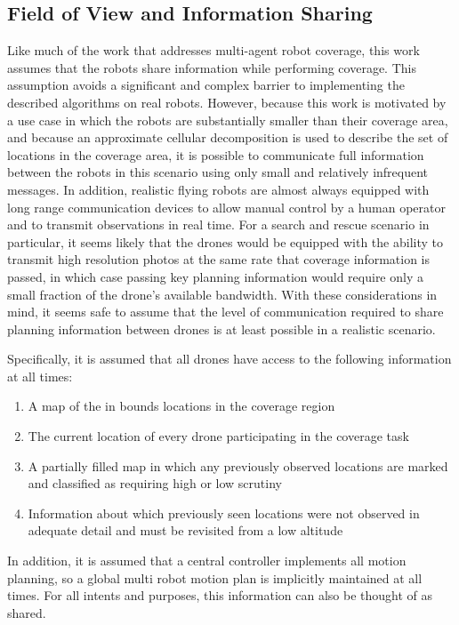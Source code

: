 \subsection{Field of View and Information Sharing}

Like much of the work that addresses multi-agent robot coverage, this work assumes that the robots share information while performing coverage. This assumption avoids a significant and complex barrier to implementing the described algorithms on real robots. However, because this work is motivated by a use case in which the robots are substantially smaller than their coverage area, and because an approximate cellular decomposition is used to describe the set of locations in the coverage area, it is possible to communicate full information between the robots in this scenario using only small and relatively infrequent messages. In addition, realistic flying robots are almost always equipped with long range communication devices to allow manual control by a human operator and to transmit observations in real time. For a search and rescue scenario in particular, it seems likely that the drones would be equipped with the ability to transmit high resolution photos at the same rate that coverage information is passed, in which case passing key planning information would require only a small fraction of the drone's available bandwidth. With these considerations in mind, it seems safe to assume that the level of communication required to share planning information between drones is at least possible in a realistic scenario.

Specifically, it is assumed that all drones have access to the following information at all times:

\begin{enumerate}
	\item A map of the in bounds locations in the coverage region
	\item The current location of every drone participating in the coverage task
	\item A partially filled map in which any previously observed locations are marked and classified as requiring high or low scrutiny
	\item Information about which previously seen locations were not observed in adequate detail and must be revisited from a low altitude
\end{enumerate}

In addition, it is assumed that a central controller implements all motion planning, so a global multi robot motion plan is implicitly maintained at all times. For all intents and purposes, this information can also be thought of as shared.

